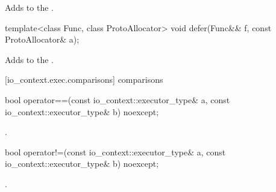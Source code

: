 \begin{itemdescr}
\pnum
\effects Adds  to the .
\end{itemdescr}

\begin{itemdecl}
template<class Func, class ProtoAllocator>
  void defer(Func&& f, const ProtoAllocator& a);
\end{itemdecl}

\begin{itemdescr}
\pnum
\effects Adds  to the .
\end{itemdescr}



[io_context.exec.comparisons]{ comparisons}

\begin{itemdecl}
bool operator==(const io_context::executor_type& a,
                const io_context::executor_type& b) noexcept;
\end{itemdecl}

\begin{itemdescr}
\pnum
\returns {}.
\end{itemdescr}

\begin{itemdecl}
bool operator!=(const io_context::executor_type& a,
                const io_context::executor_type& b) noexcept;
\end{itemdecl}

\begin{itemdescr}
\pnum
\returns {}.
\end{itemdescr}




